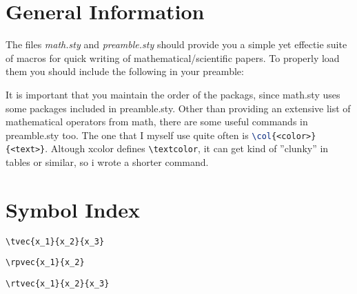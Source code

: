 \documentclass{report}
\begin{document}
  \section{General Information}
    The files \textit{math.sty} and \textit{preamble.sty} should provide you a simple yet effectie suite of
    macros for quick writing of mathematical/scientific papers. To properly load them you should include the
    following in your preamble:
    \begin{center}
        
    \end{center}

    It is important that you maintain the order of the packags, since math.sty uses some packages included in
    preamble.sty. Other than providing an extensive list of mathematical operators from math, there 
    are some useful commands in preamble.sty too.  The one that I myself use quite often is
    \lstinline[language=latex]|\col{<color>}{<text>}|. Altough xcolor defines \lstinline|\textcolor|,
    it can get kind of ''clunky'' in tables or similar, so i wrote a shorter command.


  \section{Symbol Index}

    \newsavebox\tveccol
    \begin{lrbox}{\tveccol}
      \begin{minipage}[t]{3cm}
        \lstinline|\tvec{x_1}{x_2}{x_3}|
      \end{minipage}
    \end{lrbox}

    \newsavebox\rpveccol
    \begin{lrbox}{\rpveccol}
      \begin{minipage}[t]{3cm}
        \lstinline|\rpvec{x_1}{x_2}|
      \end{minipage}
    \end{lrbox}

    \newsavebox\rtveccol
    \begin{lrbox}{\rtveccol}
      \begin{minipage}[t]{3.2cm}
        \lstinline|\rtvec{x_1}{x_2}{x_3}|
      \end{minipage}
    \end{lrbox}
\end{document}
